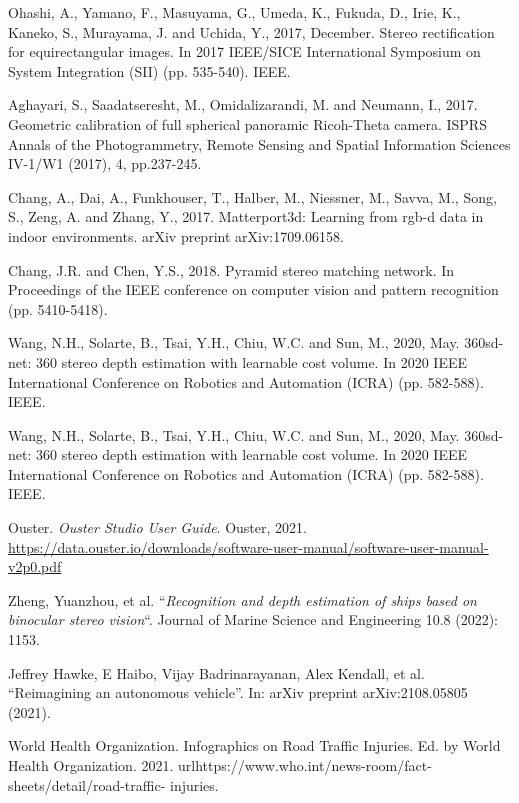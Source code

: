 \documentclass[english, LaM, oneside]{sapthesis}%
\begin{document}
\begin{thebibliography}{99}
Ohashi, A., Yamano, F., Masuyama, G., Umeda, K., Fukuda, D., Irie, K., Kaneko, S., Murayama, J. and Uchida, Y., 2017, December. Stereo rectification for equirectangular images. In 2017 IEEE/SICE International Symposium on System Integration (SII) (pp. 535-540). IEEE.

Aghayari, S., Saadatseresht, M., Omidalizarandi, M. and Neumann, I., 2017. Geometric calibration of full spherical panoramic Ricoh-Theta camera. ISPRS Annals of the Photogrammetry, Remote Sensing and Spatial Information Sciences IV-1/W1 (2017), 4, pp.237-245.

Chang, A., Dai, A., Funkhouser, T., Halber, M., Niessner, M., Savva, M., Song, S., Zeng, A. and Zhang, Y., 2017. Matterport3d: Learning from rgb-d data in indoor environments. arXiv preprint arXiv:1709.06158.

Chang, J.R. and Chen, Y.S., 2018. Pyramid stereo matching network. In Proceedings of the IEEE conference on computer vision and pattern recognition (pp. 5410-5418).

Wang, N.H., Solarte, B., Tsai, Y.H., Chiu, W.C. and Sun, M., 2020, May. 360sd-net: 360 stereo depth estimation with learnable cost volume. In 2020 IEEE International Conference on Robotics and Automation (ICRA) (pp. 582-588). IEEE.

Wang, N.H., Solarte, B., Tsai, Y.H., Chiu, W.C. and Sun, M., 2020, May. 360sd-net: 360 stereo depth estimation with learnable cost volume. In 2020 IEEE International Conference on Robotics and Automation (ICRA) (pp. 582-588). IEEE.

Ouster. \textit{Ouster Studio User Guide}. Ouster, 2021. \url{https://data.ouster.io/downloads/software-user-manual/software-user-manual-v2p0.pdf}

Zheng, Yuanzhou, et al. “\textit{Recognition and depth estimation of ships based on binocular stereo vision}“. Journal of Marine Science and Engineering 10.8 (2022): 1153.






 Jeffrey Hawke, E Haibo, Vijay Badrinarayanan, Alex Kendall, et al. “Reimagining an autonomous vehicle”. In: arXiv preprint arXiv:2108.05805 (2021).

 World Health Organization. Infographics on Road Traffic Injuries. Ed. by World Health Organization. 2021. url{https://www.who.int/news-room/fact-sheets/detail/road-traffic- injuries}.


\end{thebibliography}
\end{document}
